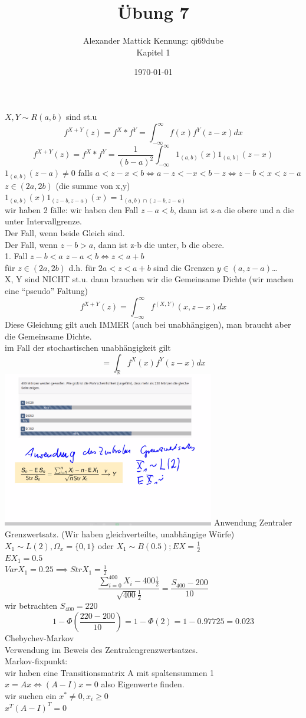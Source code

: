 \documentclass{article}
\author{
Alexander Mattick Kennung: qi69dube\\
Kapitel 1
}
\date{\today}
\title{Übung 7}
\begin{document}
	\maketitle
	$X,Y\sim R(a,b)$ sind st.u\\
	\[f^{X+Y}(z) = f^X * f^Y = \int^\infty_{-\infty}f(x)f^Y(z-x)dx  \]
	\[f^{X+Y}(z) = f^X * f^Y = \frac{1}{(b-a)^2}\int^\infty_{-\infty} 1_{(a,b)}(x)1_{(a,b)}(z-x) \]
	$1_{(a,b)}(z-a)\neq 0$ falls $a<z-x<b\iff a-z<-x< b-z\iff z-b<x<z-a$\\
	$z\in (2a,2b)$ (die summe von x,y)\\
	$1_{(a,b)}(x)1_{(z-b,z-a)}(x) = 1_{(a,b)\cap (z-b,z-a)}$\\
	wir haben 2 fälle: wir haben den Fall $z-a<b$, dann ist z-a die obere und a die unter Intervallgrenze.\\
	Der Fall, wenn beide Gleich sind.\\
	Der Fall, wenn $z-b>a$, dann ist z-b die unter, b die obere.\\
	1. Fall $z-b<a$ $z-a<b\iff z<a+b$\\
	für $z\in (2a,2b)$ d.h. für $2a<z<a+b$ sind die Grenzen $y\in (a,z-a)$\dots\\
	X, Y sind NICHT st.u. dann brauchen wir die Gemeinsame Dichte (wir machen eine ``pseudo'' Faltung)
	\[f^{X+Y}(z)=\int^\infty_{-\infty}f^{(X,Y)}(x, z-x)dx\]
	Diese Gleichung gilt auch IMMER (auch bei unabhängigen), man braucht aber die Gemeinsame Dichte.\\
	im Fall der stochastischen unabhängigkeit gilt
	\[=\int_{\mathbb{R}} f^X(x)f^Y(z-x)dx\]
	\includegraphics[height=256px]{ÜbungSchätzen.png}
	Anwendung Zentraler Grenzwertsatz. (Wir haben gleichverteilte, unabhängige Würfe)\\
	$X_1\sim L(2),\Omega_x=\{0,1\}$ oder $X_1\sim B(0.5); EX=\frac{1}{2}$\\
	$EX_1 = 0.5$\\
	$Var X_1 = 0.25\implies Str X_1 = \frac{1}{2}$\\
	\[\frac{\sum^{400}_{i=0}X_i -400\frac{1}{2}}{\sqrt{400}\frac{1}{2}} = \frac{S_{400}-200}{10}\]
	wir betrachten $S_{400} = 220$
	\[1-\Phi(\frac{220-200}{10}) = 1-\Phi(2)=1-0.97725=0.023\]
	Chebychev-Markov\\
	Verwendung im Beweis des Zentralengrenzwertsatzes.\\
	Markov-fixpunkt:\\
	wir haben eine Transitionsmatrix A mit spaltensummen 1 \\
	$x=Ax\iff (A-I)x =0$ also Eigenwerte finden.\\
	wir suchen ein $x^*\neq 0, x_i\geq 0$\\
	$x^T(A-I)^T =0$
\end{document}
